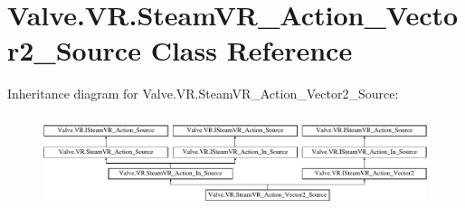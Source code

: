 \hypertarget{class_valve_1_1_v_r_1_1_steam_v_r___action___vector2___source}{}\section{Valve.\+V\+R.\+Steam\+V\+R\+\_\+\+Action\+\_\+\+Vector2\+\_\+\+Source Class Reference}
\label{class_valve_1_1_v_r_1_1_steam_v_r___action___vector2___source}
Inheritance diagram for Valve.\+V\+R.\+Steam\+V\+R\+\_\+\+Action\+\_\+\+Vector2\+\_\+\+Source\+:\begin{figure}[H]
\begin{center}
\leavevmode
\includegraphics[height=2.745098cm]{class_valve_1_1_v_r_1_1_steam_v_r___action___vector2___source}
\end{center}
\end{figure}
